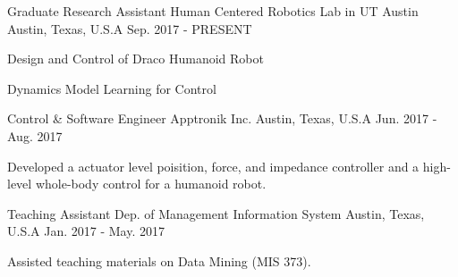 

\begin{cventries}

  \cventry
    {Graduate Research Assistant} %
    {Human Centered Robotics Lab in UT Austin} %
    {Austin, Texas, U.S.A} %
    {Sep. 2017 - PRESENT} %
    {
      \begin{cvitems} %
        \item {Design and Control of Draco Humanoid Robot}
        \item {Dynamics Model Learning for Control}
      \end{cvitems}
    }

  \cventry
    {Control \& Software Engineer} %
    {Apptronik Inc.} %
    {Austin, Texas, U.S.A} %
    {Jun. 2017 - Aug. 2017} %
    {
      \begin{cvitems} %
        \item {Developed a actuator level poisition, force, and impedance
            controller and a high-level whole-body control for a humanoid robot.}
      \end{cvitems}
    }

  \cventry
    {Teaching Assistant} %
    {Dep. of Management Information System} %
    {Austin, Texas, U.S.A} %
    {Jan. 2017 - May. 2017} %
    {
      \begin{cvitems} %
        \item {Assisted teaching materials on Data Mining (MIS 373).}
      \end{cvitems}
    }

\end{cventries}

